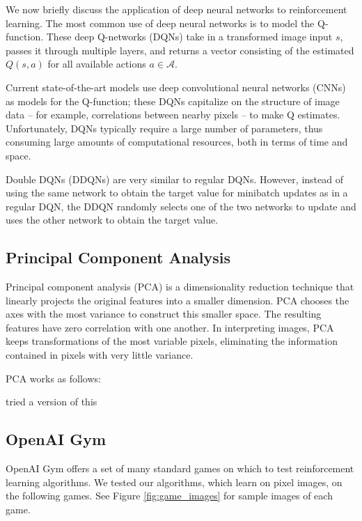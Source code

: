 \documentclass[11pt]{article}
\begin{document}
We now briefly discuss the application of deep neural networks to reinforcement learning. The most common use of deep neural networks is to model the Q-function. These deep Q-networks (DQNs) take in a transformed image input $s$, passes it through multiple layers, and returns a vector consisting of the estimated $Q(s, a)$ for all available actions $a \in \mathcal{A}$. 

Current state-of-the-art models \cite{mnih2013playing, mnih2015human} use deep convolutional neural networks (CNNs) as models for the Q-function; these DQNs capitalize on the structure of image data -- for example, correlations between nearby pixels -- to make Q estimates. Unfortunately, DQNs typically require a large number of parameters, thus consuming large amounts of computational resources, both in terms of time and space.

Double DQNs (DDQNs) \cite{van2016deep} are very similar to regular DQNs. However, instead of using the same network to obtain the target value for minibatch updates as in a regular DQN, the DDQN randomly selects one of the two networks to update and uses the other network to obtain the target value.


\subsection{Principal Component Analysis}

Principal component analysis (PCA) is a dimensionality reduction technique that linearly projects the original features into a smaller dimension. PCA chooses the axes with the most variance to construct this smaller space. The resulting features have zero correlation with one another. In interpreting images, PCA keeps transformations of the most variable pixels, eliminating the information contained in pixels with very little variance.

PCA works as follows: 

\cite{kishima2013reduction} tried a version of this

\subsection{OpenAI Gym}

OpenAI Gym \cite{brockman2016openai} offers a set of many standard games on which to test reinforcement learning algorithms. We tested our algorithms, which learn on pixel images, on the following games. See Figure \ref{fig:game_images} for sample images of each game.
\end{document}

